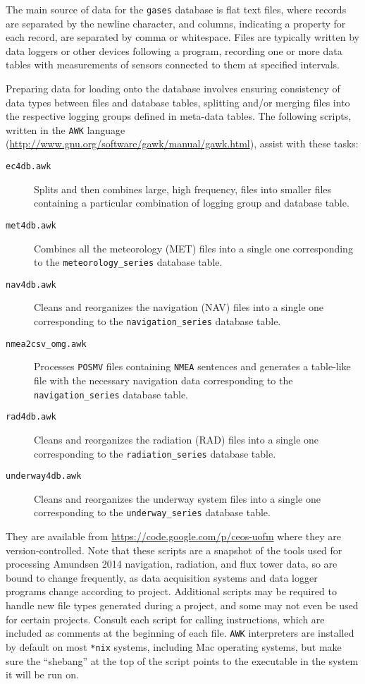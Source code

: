 \documentclass[12pt,letterpaper,titlepage,headings=small,numbers=noenddot]%
{scrartcl}
\begin{document}
The main source of data for the \texttt{gases} database is flat text files,
where records are separated by the newline character, and columns,
indicating a property for each record, are separated by comma or
whitespace.  Files are typically written by data loggers or other devices
following a program, recording one or more data tables with measurements of
sensors connected to them at specified intervals.

Preparing data for loading onto the database involves ensuring consistency
of data types between files and database tables, splitting and/or merging
files into the respective logging groups defined in meta-data tables.  The
following scripts, written in the \texttt{AWK} language
(\url{http://www.gnu.org/software/gawk/manual/gawk.html}), assist with
these tasks:

\begin{description}
\item[\texttt{ec4db.awk}] Splits and then combines large, high frequency,
  files into smaller files containing a particular combination of logging
  group and database table.
\item[\texttt{met4db.awk}] Combines all the meteorology (MET) files into a
  single one corresponding to the \texttt{meteorology\_series} database
  table.
\item[\texttt{nav4db.awk}] Cleans and reorganizes the navigation (NAV)
  files into a single one corresponding to the \texttt{navigation\_series}
  database table.
\item[\texttt{nmea2csv\_omg.awk}] Processes \texttt{POSMV} files containing
  \texttt{NMEA} sentences and generates a table-like file with the
  necessary navigation data corresponding to the
  \texttt{navigation\_series} database table.
\item[\texttt{rad4db.awk}] Cleans and reorganizes the radiation (RAD) files
  into a single one corresponding to the \texttt{radiation\_series}
  database table.
\item[\texttt{underway4db.awk}] Cleans and reorganizes the underway system
  files into a single one corresponding to the \texttt{underway\_series}
  database table.
\end{description}

They are available from \url{https://code.google.com/p/ceos-uofm} where
they are version-controlled. Note that these scripts are a snapshot of the
tools used for processing Amundsen 2014 navigation, radiation, and flux
tower data, so are bound to change frequently, as data acquisition systems
and data logger programs change according to project.  Additional scripts
may be required to handle new file types generated during a project, and
some may not even be used for certain projects.  Consult each script for
calling instructions, which are included as comments at the beginning of
each file.  \texttt{AWK} interpreters are installed by default on most
\texttt{*nix} systems, including Mac operating systems, but make sure the
``shebang'' at the top of the script points to the executable in the system
it will be run on.
\end{document}

